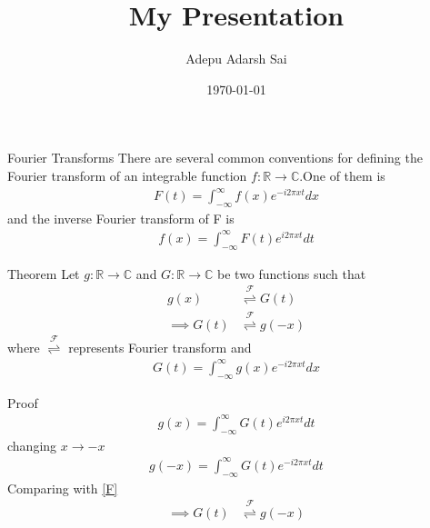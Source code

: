 \documentclass{beamer}
\title{My Presentation}
\author{Adepu Adarsh Sai}
\institute{IITH(AI)}
\date{\today}
\newcommand{\R}{\mathbb{R}}
\newcommand{\C}{\mathbb{C}}
\providecommand{\brak}[1]{\ensuremath{\left(#1\right)}}
\providecommand{\fourier}{\overset{\mathcal{F}}{ \rightleftharpoons}}
\begin{document}
\begin{frame}
\titlepage
\end{frame}
\begin{frame}{Fourier Transforms}
There are several common conventions for defining the Fourier transform of an integrable function $f:\R \rightarrow \C$.One of them is
\begin{align}
    F(t)=\int_{-\infty}^{\infty}f(x)e^{-i2\pi xt}dx
\end{align}
and the inverse Fourier transform of F is 
\begin{align}
    f(x)=\int_{-\infty}^{\infty}F(t)e^{i2\pi xt}dt
\end{align}
\end{frame}
\begin{frame}{Theorem}
Let $g:\R \rightarrow \C$ and $G:\R \rightarrow \C$ be two functions such that
\begin{align}
     g\brak{x} &\fourier G\brak{t}\\
     \implies G\brak{t} &\fourier g\brak{-x} \label{th}
\end{align}
where $ \fourier$ represents Fourier transform and
\begin{align}
    G\brak{t}  = \int_{-\infty}^{\infty} g\brak{x} e^{-i2\pi xt} dx 
    \label{F}
\end{align}
\end{frame}
\begin{frame}{Proof}
\begin{align}
    g(x)=\int_{-\infty}^{\infty}G(t)e^{i2\pi xt}dt
\end{align}
changing $x \rightarrow -x$
\begin{align}
    g(-x)=\int_{-\infty}^{\infty}G(t)e^{-i2\pi xt}dt
\end{align}
Comparing with \eqref{F}
\begin{align}
    \implies G\brak{t} &\fourier g\brak{-x} \label{th1}
\end{align}
\end{frame}
\end{document}
